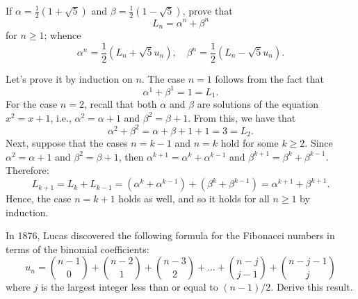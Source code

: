 \begin{exercise}
    If $\alpha = \frac{1}{2}(1 + \sqrt{5})$ and $\beta = \frac{1}{2}(1 - \sqrt{5})$, prove that 
    $$L_n = \alpha^n + \beta^n$$
    for $n \geq 1$; whence
    $$\alpha^n = \frac{1}{2}(L_n + \sqrt{5}u_n), \quad \beta^n = \frac{1}{2}(L_n - \sqrt{5}u_n).$$
\end{exercise}

\begin{solution}
    Let's prove it by induction on $n$. The case $n = 1$ follows from the fact that 
    $$\alpha^1 + \beta^1 = 1 = L_1.$$
    For the case $n = 2$, recall that both $\alpha$ and $\beta$ are solutions of the equation $x^2 = x + 1$, i.e., $\alpha^2 = \alpha + 1$ and $\beta^2 = \beta + 1$. From this, we have that 
    $$\alpha^2 + \beta^2 = \alpha + \beta + 1 + 1 = 3 = L_2.$$
    Next, suppose that the cases $n = k-1$ and $n = k$ hold for some $k \geq 2$. Since $\alpha^2 = \alpha + 1$ and $\beta^2 = \beta + 1$, then $\alpha^{k+1} = \alpha^k + \alpha^{k-1}$ and $\beta^{k+1} = \beta^k + \beta^{k-1}$. Therefore:
    $$L_{k+1} = L_k + L_{k-1} = (\alpha^k + \alpha^{k-1}) + (\beta^k + \beta^{k-1}) = \alpha^{k+1} + \beta^{k+1}.$$
    Hence, the case $n = k+1$ holds as well, and so it holds for all $n \geq 1$ by induction.\\
\end{solution}

\begin{exercise}
    In 1876, Lucas discovered the following formula for the Fibonacci numbers in terms of the binomial coefficients:
    $$u_n = \binom{n-1}{0} + \binom{n-2}{1} +\binom{n-3}{2} + \dots + \binom{n-j}{j-1} + \binom{n-j-1}{j}$$
    where $j$ is the largest integer less than or equal to $(n-1)/2$. Derive this result.  \\
\end{exercise}

